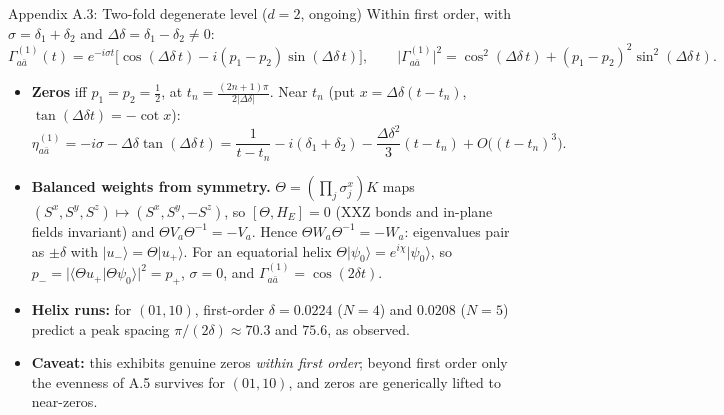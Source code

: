 \documentclass[aspectratio=169,11pt]{beamer}
\newcommand{\ket}[1]{\lvert #1\rangle}
\begin{document}
\begin{frame}{Appendix A.3: Two-fold degenerate level ($d=2$, ongoing)}
\footnotesize
Within first order, with $\sigma=\delta_1+\delta_2$ and $\Delta\delta=\delta_1-\delta_2\neq0$:
\[
\Gamma^{(1)}_{a\bar a}(t)=e^{-i\sigma t}\bigl[\cos(\Delta\delta\,t)-i(p_1-p_2)\sin(\Delta\delta\,t)\bigr],\qquad
\lvert\Gamma^{(1)}_{a\bar a}\rvert^2=\cos^2(\Delta\delta\,t)+(p_1-p_2)^2\sin^2(\Delta\delta\,t).
\]
\begin{itemize}\setlength\itemsep{3pt}
\item \textbf{Zeros} iff $p_1=p_2=\tfrac12$, at $t_n=\frac{(2n+1)\pi}{2\lvert\Delta\delta\rvert}$. Near $t_n$ (put $x=\Delta\delta(t-t_n)$, $\tan(\Delta\delta t)=-\cot x$):
\[
\eta^{(1)}_{a\bar a}=-i\sigma-\Delta\delta\tan(\Delta\delta\,t)=\frac1{t-t_n}-i(\delta_1+\delta_2)-\frac{\Delta\delta^2}{3}(t-t_n)+O\bigl((t-t_n)^3\bigr).
\]
\item \textbf{Balanced weights from symmetry.} $\Theta=(\prod_j\sigma_j^x)K$ maps $(S^x,S^y,S^z)\mapsto(S^x,S^y,-S^z)$, so $[\Theta,H_E]=0$ (XXZ bonds and in-plane fields invariant) and $\Theta V_a\Theta^{-1}=-V_a$. Hence $\Theta W_a\Theta^{-1}=-W_a$: eigenvalues pair as $\pm\delta$ with $\ket{u_-}=\Theta\ket{u_+}$. For an equatorial helix $\Theta\ket{\psi_0}=e^{i\chi}\ket{\psi_0}$, so $p_-=\lvert\langle\Theta u_+\vert\Theta\psi_0\rangle\rvert^2=p_+$, $\sigma=0$, and $\Gamma^{(1)}_{a\bar a}=\cos(2\delta t)$.
\item \textbf{Helix runs:} for $(01,10)$, first-order $\delta=0.0224$ ($N=4$) and $0.0208$ ($N=5$) predict a peak spacing $\pi/(2\delta)\approx70.3$ and $75.6$, as observed.
\item \textbf{Caveat:} this exhibits genuine zeros \emph{within first order}; beyond first order only the evenness of A.5 survives for $(01,10)$, and zeros are generically lifted to near-zeros.
\end{itemize}
\end{frame}
\end{document}
